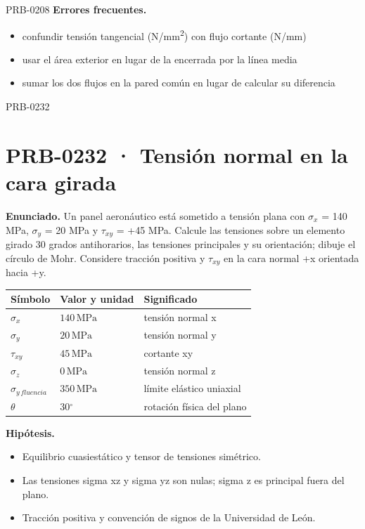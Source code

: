 \begin{studiumworked}{PRB-0208}
\textbf{Errores frecuentes.}\begin{itemize}\item confundir tensión tangencial (N/mm\textsuperscript{2}) con flujo cortante (N/mm)
\item usar el área exterior en lugar de la encerrada por la línea media
\item sumar los dos flujos en la pared común en lugar de calcular su diferencia\end{itemize}

\end{studiumworked}

\Needspace{.3\textheight}

\begin{studiumworked}{PRB-0232}

\section{PRB-0232 · Tensión normal en la cara girada}

\textbf{Enunciado.} Un panel aeronáutico está sometido a tensión plana con $\sigma_x$ = 140 MPa, $\sigma_y$ = 20 MPa y $\tau_{xy}$ = +45 MPa. Calcule las tensiones sobre un elemento girado 30 grados antihorarios, las tensiones principales y su orientación; dibuje el círculo de Mohr. Considere tracción positiva y $\tau_{xy}$ en la cara normal +x orientada hacia +y.

\par\medskip\noindent\begin{tabular}{@{}p{.18\linewidth}p{.26\linewidth}p{.48\linewidth}@{}}
\toprule Símbolo & Valor y unidad & Significado\\\midrule
$\sigma_{x}$ & $140\,\mathrm{MPa}$ & tensión normal x\\
$\sigma_{y}$ & $20\,\mathrm{MPa}$ & tensión normal y\\
$\tau_{xy}$ & $45\,\mathrm{MPa}$ & cortante xy\\
$\sigma_{z}$ & $0\,\mathrm{MPa}$ & tensión normal z\\
$\sigma_{y\,fluencia}$ & $350\,\mathrm{MPa}$ & límite elástico uniaxial\\
$\theta$ & $30{}^{\circ}$ & rotación física del plano\\
\bottomrule\end{tabular}\par\medskip

\textbf{Hipótesis.}\begin{itemize}\item Equilibrio cuasiestático y tensor de tensiones simétrico.
\item Las tensiones sigma xz y sigma yz son nulas; sigma z es principal fuera del plano.
\item Tracción positiva y convención de signos de la Universidad de León.\end{itemize}


\end{studiumworked}
